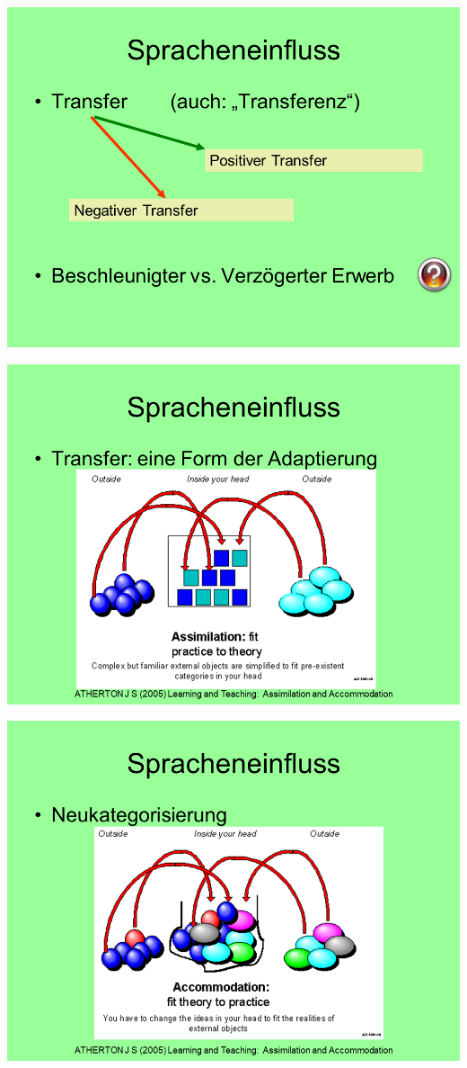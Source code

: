 \documentclass[
  letterpaper,
]{scrbook}
\begin{document}
\includegraphics[width=1\textwidth,height=\textheight]{./pictures/02_Spracheneinfluss_Sprachentrennung/Diapozitiv20.PNG}

\includegraphics[width=1\textwidth,height=\textheight]{./pictures/02_Spracheneinfluss_Sprachentrennung/Diapozitiv21.PNG}

\includegraphics[width=1\textwidth,height=\textheight]{./pictures/02_Spracheneinfluss_Sprachentrennung/Diapozitiv22.PNG}
\end{document}
